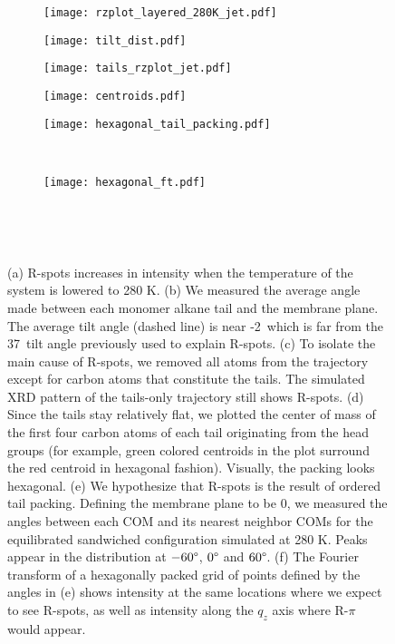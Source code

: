   \begin{figure}[!htb]
  \begin{subfigure}{0.32\linewidth}
  	\centering
  	\texttt{[image: rzplot\_layered\_280K\_jet.pdf]}
  	\caption{}\label{fig:sandwiched280K}
  \end{subfigure}
  \begin{subfigure}{0.32\linewidth}
    \texttt{[image: tilt\_dist.pdf]}
    \caption{}\label{fig:tilt}
  \end{subfigure}
  \begin{subfigure}{0.32\linewidth}
	\centering
	\texttt{[image: tails\_rzplot\_jet.pdf]}
	\caption{}\label{fig:tails_rzplot}
  \end{subfigure}
  \begin{subfigure}[t]{0.32\linewidth}
    \centering
	\texttt{[image: centroids.pdf]}
  \caption{}\label{fig:centroids}
  \end{subfigure}
  \begin{subfigure}[t]{0.32\linewidth}
        \centering
	        \texttt{[image: hexagonal\_tail\_packing.pdf]}
	        \caption{}~\label{fig:layered_tails}
  \end{subfigure}
  \begin{subfigure}[t]{0.32\textwidth}
        	\centering
	        \texttt{[image: hexagonal\_ft.pdf]}  %
	        \caption{}~\label{fig:hexagonal_ft}
  \end{subfigure}
  \caption{(a) R-spots increases in intensity when the temperature of the system is 
	  lowered to 280 K. (b) We measured the average angle made between each
	  monomer alkane tail and the membrane plane. The average tilt angle (dashed
	  line) is near -2\degree~which is far from the 37\degree~tilt angle previously
	  used to explain R-spots. (c) To isolate the main cause of R-spots, we removed
	  all atoms from the trajectory except for carbon atoms that constitute the
	  tails. The simulated XRD pattern of the tails-only trajectory still shows
	  R-spots. (d) Since the tails stay relatively flat, we plotted the center of
	  mass of the first four carbon atoms of each tail originating from the head
	  groups (for example, green colored centroids in the plot surround the red
	  centroid in hexagonal fashion).  Visually, the packing looks hexagonal. (e) We
	  hypothesize that R-spots is the result of ordered tail packing. Defining the
	  membrane plane to be 0\degree, we measured the angles between each COM and its
	  nearest neighbor COMs for the equilibrated sandwiched configuration simulated
	  at 280 K. Peaks appear in the distribution at $-60\degree$, $0\degree$ and
	  $60\degree$. (f) The Fourier transform of a hexagonally packed grid of points
	  defined by the angles in (e) shows intensity at the same locations where we
	  expect to see R-spots, as well as intensity along the $q_z$ axis
          where R-$\pi$ would appear.}~\label{fig:tail_packing}
  \end{figure}  

